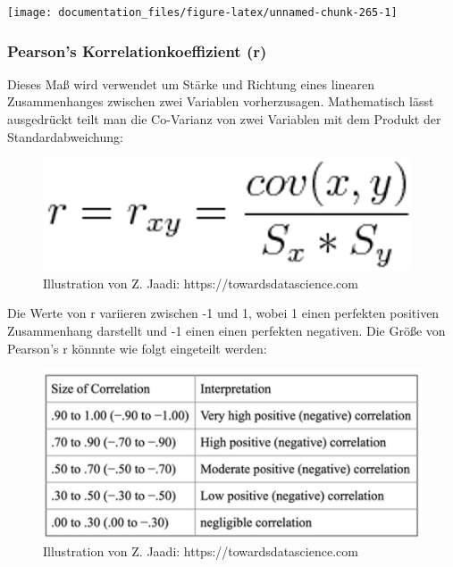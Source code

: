\documentclass[
]{article}
\begin{document}
\begin{center}\texttt{[image: documentation\_files/figure-latex/unnamed-chunk-265-1]} \end{center}

\hypertarget{pearsons-korrelationkoeffizient-r}{%
\subsubsection{Pearson's Korrelationkoeffizient (r)}\label{pearsons-korrelationkoeffizient-r}}

Dieses Maß wird verwendet um Stärke und Richtung eines linearen Zusammenhanges zwischen zwei Variablen vorherzusagen. Mathematisch lässt ausgedrückt teilt man die Co-Varianz von zwei Variablen mit dem Produkt der Standardabweichung:

\begin{figure}

{\centering \includegraphics[width=1\linewidth]{images/057} 

}

\caption{Illustration von Z. Jaadi: https://towardsdatascience.com}\label{fig:unnamed-chunk-266}
\end{figure}

Die Werte von r variieren zwischen -1 und 1, wobei 1 einen perfekten positiven Zusammenhang darstellt und -1 einen einen perfekten negativen. Die Größe von Pearson's r könnnte wie folgt eingeteilt werden:

\begin{figure}

{\centering \includegraphics[width=1\linewidth]{images/058} 

}

\caption{Illustration von Z. Jaadi: https://towardsdatascience.com}\label{fig:unnamed-chunk-267}
\end{figure}
\end{document}
